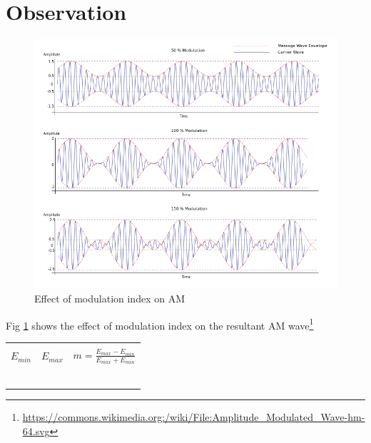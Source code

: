 \documentclass{book}
\begin{document}
\section*{Observation}


\begin{figure}[h]

\includegraphics[width=\textwidth]{AMmodindex.png}
\caption{Effect of modulation index on AM}
\label{AMmodindex}
\end{figure}
\noindent Fig \ref{AMmodindex}  shows the effect of modulation index on the resultant AM wave\footnote{\url{https://commons.wikimedia.org:/wiki/File:Amplitude_Modulated_Wave-hm-64.svg}}
\begin{center}

\begin{tabular}{|l|l|l|}

\hline
 & &\\
 
$E_{min}$  & $E_{max}$ & $m=\frac{E_{max}-E_{min}}{E_{max}+E_{min}}$ \\
 & & \\ \hline
 & & \\ \hline
& & \\ \hline
& & \\ \hline
& & \\ \hline
& & \\ \hline

\end{tabular}
\end{center}
\end{document}
